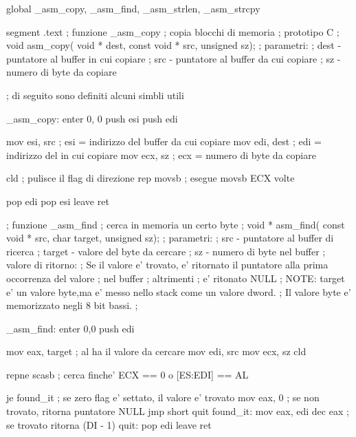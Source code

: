 \begin{AsmCodeListing}[label=memory.asm]
global _asm_copy, _asm_find, _asm_strlen, _asm_strcpy

segment .text
; funzione _asm_copy
; copia blocchi di memoria
; prototipo C
; void asm_copy( void * dest, const void * src, unsigned sz);
; parametri:
;   dest - puntatore al buffer in cui copiare
;   src  - puntatore al buffer da cui copiare
;   sz   - numero di byte da copiare

; di seguito sono definiti alcuni simbli utili

_asm_copy:
        enter   0, 0
        push    esi
        push    edi

        mov     esi, src        ; esi = indirizzo del buffer da cui copiare
        mov     edi, dest       ; edi = indirizzo del in cui copiare
        mov     ecx, sz         ; ecx = numero di byte da copiare

        cld                     ; pulisce il flag di direzione
        rep     movsb           ; esegue movsb ECX volte

        pop     edi
        pop     esi
        leave
        ret


; funzione _asm_find
; cerca in memoria un certo byte
; void * asm_find( const void * src, char target, unsigned sz);
; parametri:
;   src    - puntatore al buffer di ricerca
;   target - valore del byte da cercare
;   sz     - numero di byte nel buffer
; valore di ritorno:
;   Se il valore e' trovato, e' ritornato il puntatore alla prima occorrenza del valore
;   nel buffer
;   altrimenti
;     e' ritonato NULL 
; NOTE: target e' un valore byte,ma e' messo nello stack come un valore dword.
;       Il valore byte e' memorizzato negli 8 bit bassi.
; 

_asm_find:
        enter   0,0
        push    edi

        mov     eax, target     ; al ha il valore da cercare
        mov     edi, src
        mov     ecx, sz
        cld

        repne   scasb           ; cerca finche' ECX == 0 o [ES:EDI] == AL

        je      found_it        ; se zero flag e' settato, il valore e' trovato
        mov     eax, 0          ; se non trovato, ritorna puntatore NULL 
        jmp     short quit
found_it:
        mov     eax, edi          
        dec     eax              ; se trovato ritorna (DI - 1)
quit:
        pop     edi
        leave
        ret



\end{AsmCodeListing}
